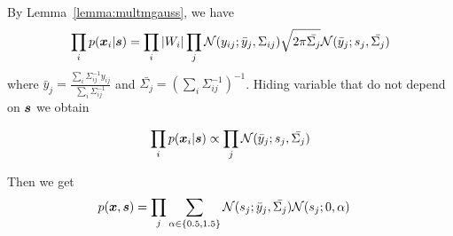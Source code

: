 By Lemma~\ref{lemma:multmgauss}, we have
\begin{align}
  \prod_i p(\boldsymbol{x}_i | \boldsymbol{s}) &= \prod_i |W_i| \prod_j \mathcal{N}(y_{ij}; \bar{y}_{j}, \Sigma_{ij}) \sqrt{2 \pi \bar{\Sigma_{j}}} \mathcal{N}(\bar{y}_j; s_j, \bar{\Sigma_{j}})  \\
\end{align}
where $\bar{y}_j = \frac{\sum_i \Sigma_{ij}^{-1} y_{ij}}{ \sum_i
  \Sigma_{ij}^{-1}}$ and $\bar{\Sigma_{j}} = (\sum_i
\Sigma_{ij}^{-1})^{-1}$.
Hiding variable that do not depend on $\boldsymbol{s}$ we obtain

\begin{align}
  \prod_i p(\boldsymbol{x}_i | \boldsymbol{s}) &\propto \prod_j \mathcal{N}(\bar{y}_j; s_j, \bar{\Sigma_{j}})  \\
\end{align}

Then we get
\begin{align}
  p(\boldsymbol{x}, \boldsymbol{s}) &= \prod_j \sum_{\alpha \in \{0.5, 1.5\}} \mathcal{N}(s_j; \bar{y}_j, \bar{\Sigma_{j}}) \mathcal{N}(s_j; 0, \alpha)
\end{align}

